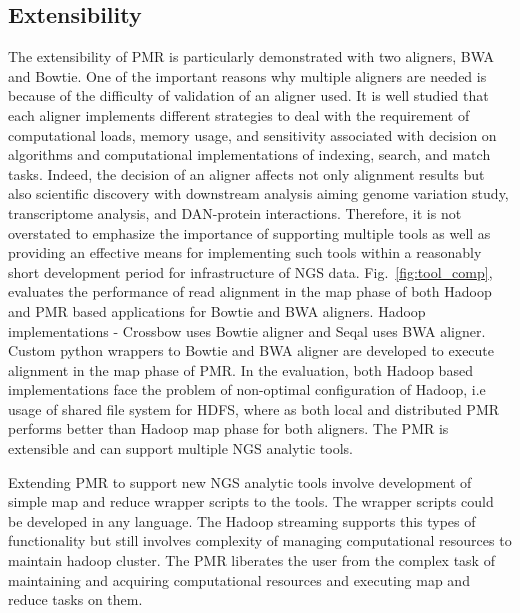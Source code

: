 \documentclass{acm_proc_article-sp}
\begin{document}
\subsection{Extensibility}
The extensibility of PMR is particularly demonstrated with two aligners, BWA and Bowtie.  One of the important reasons why multiple aligners are needed is because of the difficulty of validation of an aligner used.  It is well studied that each aligner implements different strategies to deal with the requirement of computational loads, memory usage, and sensitivity associated with decision on algorithms and computational implementations of indexing, search, and match tasks\cite{mapping-survey}. Indeed, the decision of an aligner affects not only alignment results but also scientific discovery with downstream analysis aiming genome variation study, transcriptome analysis, and DAN-protein interactions. Therefore, it is not overstated to emphasize the importance of supporting multiple tools as well as providing an effective means for implementing such tools within a reasonably short development period for infrastructure of NGS data. 
Fig.~\ref{fig:tool_comp}, evaluates the performance of read alignment in the map phase of both Hadoop and PMR based applications for Bowtie and BWA aligners. Hadoop implementations - Crossbow uses Bowtie aligner and Seqal uses BWA aligner.  Custom python wrappers to Bowtie and BWA aligner are developed to execute alignment in the map phase of PMR. In the evaluation, both Hadoop based implementations face the problem of non-optimal configuration of Hadoop, i.e usage of shared file system for HDFS, where as both local and distributed PMR performs better than Hadoop map phase for both aligners. The PMR is extensible and can support multiple NGS analytic tools. 

Extending PMR to support new NGS analytic tools involve development of simple map and reduce wrapper scripts to the tools. The wrapper scripts could be developed in any language. 
The Hadoop streaming supports this types of functionality but still involves complexity of managing computational resources to maintain hadoop cluster.
The PMR liberates the user from the complex task of maintaining and acquiring computational resources and executing map and reduce tasks on them.
\end{document}
